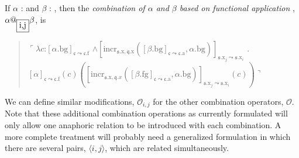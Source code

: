 \begin{ex} 
If $\alpha$ :  
and $\beta$ : 
 ,
                         then the \textit{combination of $\alpha$ and
    $\beta$  based on functional application }, $\alpha\text{@}_{\fbox{i,j}}\beta$, is
  \begin{quote}
    $\ulcorner\lambda c$:$[\alpha.\text{bg}]_{\mathfrak{c}\leadsto\mathfrak{c}.\text{f}}$
      \d{$\wedge$}$[\mathrm{incr}_{\mathfrak{s}.\text{x},\mathfrak{q}.\text{x}}([\beta.\text{bg}]_{\mathfrak{c}\leadsto\mathfrak{c}.\text{a}},\alpha.\text{bg})]_{\boxed{\scriptstyle\mathfrak{s}.\text{x}_j\leadsto\mathfrak{s}.\text{x}_i}}$
      . \\ \hspace*{2em}$[\alpha]_{\mathfrak{c}\leadsto\mathfrak{c}.\text{f}}(c)([\mathrm{incr}_{\mathfrak{s}.\text{x},\mathfrak{q}.x}([\beta.\text{fg}]_{\mathfrak{c}\leadsto\mathfrak{c}.\text{a}},\alpha.\text{bg})]_{\boxed{\scriptstyle\mathfrak{s}.\text{x}_j\leadsto\mathfrak{s}.\text{x}_i}}(c))\urcorner$
\end{quote}

\label{ex:combine-align}

\end{ex} 
We can define similar modifications, $\mathcal{O}_{i,j}$ for the other combination
operators, $\mathcal{O}$.  Note that these additional combination
operations as currently formulated will only allow one anaphoric
relation to be introduced with each combination.  A more complete
treatment will probably need a generalized formulation in which there
are several pairs, $\langle i,j\rangle$, which are related simultaneously.

